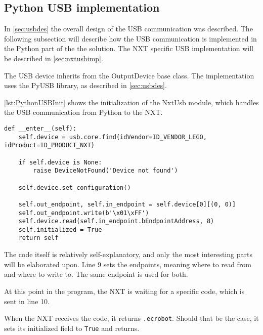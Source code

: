 \subsection{Python USB implementation}\label{sol:subsec:pythonusb}
In \autoref{sec:usbdes} the overall design of the USB communication was described.
The following subsection will describe how the USB communication is implemented in the Python part of the the solution.
The NXT specific USB implementation will be described in \autoref{sec:nxtusbimp}.

The USB device inherits from the OutputDevice base class.
The implementation uses the PyUSB library, as described in \autoref{sec:usbdes}\cite{PyUSB}.

\autoref{lst:PythonUSBInit} shows the initialization of the NxtUsb module, which handles the USB communication from Python to the NXT.
\begin{lstlisting}[label={lst:PythonUSBInit},caption={The initialization of PyUSB{.} Comments removed}]
def __enter__(self):
    self.device = usb.core.find(idVendor=ID_VENDOR_LEGO, idProduct=ID_PRODUCT_NXT)

    if self.device is None:
        raise DeviceNotFound('Device not found')

    self.device.set_configuration()

    self.out_endpoint, self.in_endpoint = self.device[0][(0, 0)]
    self.out_endpoint.write(b'\x01\xFF') 
    self.device.read(self.in_endpoint.bEndpointAddress, 8) 
    self.initialized = True
    return self
\end{lstlisting}

The code itself is relatively self-explanatory, and only the most interesting parts will be elaborated upon.
Line 9 sets the endpoints, meaning where to read from and where to write to.
The same endpoint is used for both.

At this point in the program, the NXT is waiting for a specific code, which is sent in line 10.

When the NXT receives the code, it returns \texttt{{.}ecrobot}.
Should that be the case, it sets its initialized field to \texttt{True} and returns.





